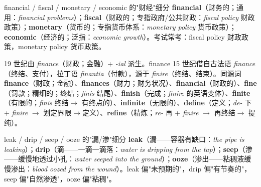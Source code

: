 \documentclass[../main.tex]{subfiles}
\begin{document}
\begin{gram}{financial / fiscal / monetary / economic 的"财经"细分}
\textbf{financial}（财务的；通用：\textit{financial problems}）；\textbf{fiscal}（财政的；专指政府/公共财政：\textit{fiscal policy} 财政政策）；\textbf{monetary}（货币的；专指货币体系：\textit{monetary policy} 货币政策）；\textbf{economic}（经济的；泛指：\textit{economic growth}）。考试常考：fiscal policy 财政政策，monetary policy 货币政策。
\end{gram}

\begin{origin}
19 世纪由 \textit{finance}（财政；金融）+ \textit{-ial} 派生。finance 15 世纪借自古法语 \textit{finance}（终结、支付），拉丁语 \textit{finantia}（付款），源于 \textit{finire}（终结、结束）。同源词 \textbf{finance}（财政；金融）、\textbf{finances}（财力；财务状况）、\textbf{financial}（财政的）、\textbf{fine}（罚款；精细的；终结；\textit{finis} 结尾）、\textbf{finish}（完成；\textit{finire} 的英语变体）、\textbf{finite}（有限的；\textit{finis} 终结$\to$ 有终点的）、\textbf{infinite}（无限的）、\textbf{define}（定义；\textit{de-} 下 + \textit{finire} $\to$ 划定界限$\to$定义）、\textbf{refine}（精炼；\textit{re-} 再 + \textit{finire} $\to$ 再终结$\to$ 提纯）。
\end{origin}






\begin{lex}{leak / drip / seep / ooze 的"漏/渗"细分}
\textbf{leak}（漏——容器有缺口：\textit{the pipe is leaking}）；\textbf{drip}（滴——一滴一滴落：\textit{water is dripping from the tap}）；\textbf{seep}（渗——缓慢地透过小孔：\textit{water seeped into the ground}）；\textbf{ooze}（渗出——粘稠液缓慢渗出：\textit{blood oozed from the wound}）。leak 偏"未预期的"，drip 偏"有节奏的"，seep 偏"自然渗透"，ooze 偏"粘稠"。
\end{lex}
\end{document}
